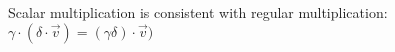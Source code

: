 \documentclass[preview]{standalone}
\begin{document}
\begin{center}
Scalar multiplication is consistent with regular multiplication: $ \gamma\cdot(\delta \cdot \overrightarrow{v}) = ( \gamma\delta) \cdot \overrightarrow{v}) $
\end{center}
\end{document}
